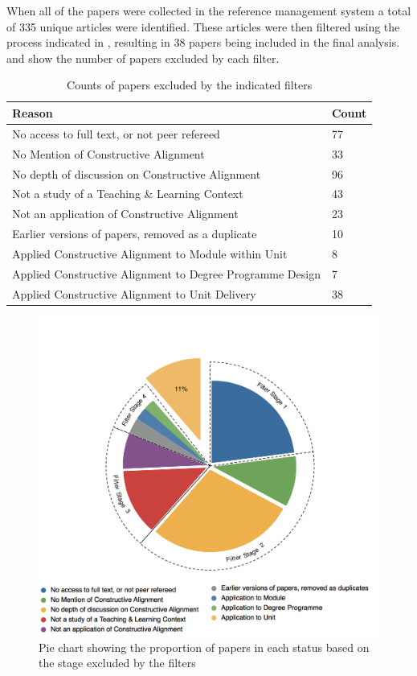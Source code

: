 When all of the papers were collected in the reference management system a total of 335 unique articles were identified. These articles were then filtered using the process indicated in , resulting in 38 papers being included in the final analysis.  and  show the number of papers excluded by each filter.

\begin{table}[p]
	\centering
	\caption{Counts of papers excluded by the indicated filters}
	\label{tbl:exclude_reason}
	\footnotesize
    \begin{tabular}{ll}
    \textbf{Reason} & \textbf{Count} \\ \hline
    No access to full text, or not peer refereed & 77 \\
    No Mention of Constructive Alignment & 33 \\
    No depth of discussion on Constructive Alignment & 96 \\
    Not a study of a Teaching \& Learning Context & 43 \\
    Not an application of Constructive Alignment & 23 \\
    Earlier versions of papers, removed as a duplicate & 10 \\
    Applied Constructive Alignment to Module within Unit & 8 \\
    Applied Constructive Alignment to Degree Programme Design & 7 \\ \hline
    Applied Constructive Alignment to Unit Delivery & 38 \\
    \end{tabular}
\end{table}

\begin{figure}[p]
	\centering
	\includegraphics[width=\textwidth]{FilterResults}
	\caption{Pie chart showing the proportion of papers in each status based on the stage excluded by the filters}
	\label{fig:filter_results}
\end{figure}

